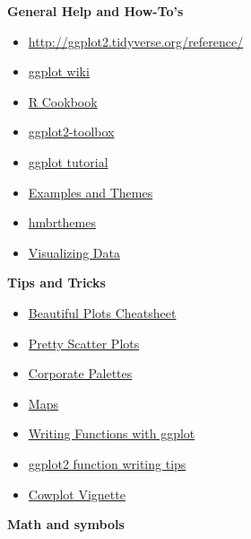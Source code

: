 \documentclass[]{book}
\providecommand{\tightlist}{%
  \setlength{\itemsep}{0pt}\setlength{\parskip}{0pt}}
\theoremstyle{definition}
\theoremstyle{definition}
\theoremstyle{definition}
\theoremstyle{remark}
\begin{document}
\textbf{General Help and How-To's}

\begin{itemize}
\tightlist
\item
  \url{http://ggplot2.tidyverse.org/reference/}
\item
  \href{https://github.com/tidyverse/ggplot2/wiki}{ggplot wiki}
\item
  \href{http://www.cookbook-r.com/Graphs/}{R Cookbook}
\item
  \href{https://rpubs.com/hadley/ggplot2-toolbox}{ggplot2-toolbox}
\item
  \href{http://r-statistics.co/ggplot2-Tutorial-With-R.html}{ggplot
  tutorial}
\item
  \href{https://rstudio-pubs-static.s3.amazonaws.com/3364_d1a578f521174152b46b19d0c83cbe7e.html}{Examples
  and Themes}
\item
  \href{https://cran.r-project.org/web/packages/hrbrthemes/vignettes/why_hrbrthemes.html}{hmbrthemes}
\item
  \href{https://flowingdata.com/category/guides/}{Visualizing Data}
\end{itemize}

\textbf{Tips and Tricks}

\begin{itemize}
\tightlist
\item
  \href{http://www.cs.utexas.edu/~cannata/dataVis/Class\%20Notes/Beautiful\%20plotting\%20in\%20R_\%20A\%20ggplot2\%20cheatsheet\%20_\%20Technical\%20Tidbits\%20From\%20Spatial\%20Analysis\%20\&\%20Data\%20Science.pdf}{Beautiful
  Plots Cheatsheet}
\item
  \href{https://drsimonj.svbtle.com/pretty-scatter-plots-with-ggplot2}{Pretty
  Scatter Plots}
\item
  \href{https://drsimonj.svbtle.com/creating-corporate-colour-palettes-for-ggplot2}{Corporate
  Palettes}
\item
  \href{https://geocompr.robinlovelace.net/}{Maps}
\item
  \href{https://groups.google.com/forum/\#!topic/ggplot2/qVE6Uxd_IFQ}{Writing
  Functions with ggplot}
\item
  \href{http://novyden.blogspot.com/2013/07/ggplot-inside-function-needs-some-care.html}{ggplot2
  function writing tips}
\item
  \href{https://cran.r-project.org/web/packages/cowplot/vignettes/introduction.html}{Cowplot
  Vignette}
\end{itemize}

\textbf{Math and symbols}
\end{document}
